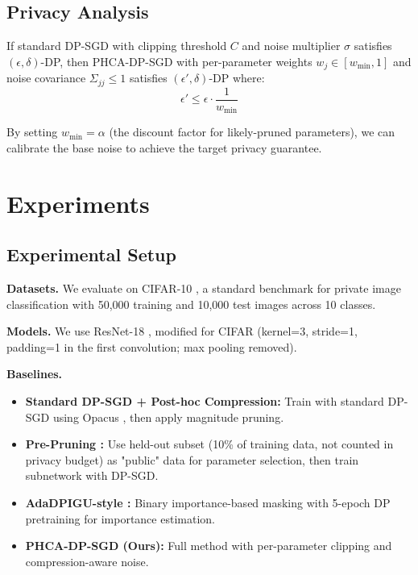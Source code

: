 \documentclass[11pt,a4paper]{article}
\begin{document}
\subsection{Privacy Analysis}

\begin{theorem}
If standard DP-SGD with clipping threshold $C$ and noise multiplier $\sigma$ satisfies $(\epsilon, \delta)$-DP, then PHCA-DP-SGD with per-parameter weights $w_j \in [w_{\min}, 1]$ and noise covariance $\Sigma_{jj} \leq 1$ satisfies $(\epsilon', \delta)$-DP where:
\begin{equation}
\epsilon' \leq \epsilon \cdot \frac{1}{w_{\min}}
\end{equation}
\end{theorem}

By setting $w_{\min} = \alpha$ (the discount factor for likely-pruned parameters), we can calibrate the base noise to achieve the target privacy guarantee.

\section{Experiments}

\subsection{Experimental Setup}

\textbf{Datasets.} We evaluate on CIFAR-10 \citep{krizhevsky2009learning}, a standard benchmark for private image classification with 50,000 training and 10,000 test images across 10 classes.

\textbf{Models.} We use ResNet-18 \citep{he2016deep}, modified for CIFAR (kernel=3, stride=1, padding=1 in the first convolution; max pooling removed).

\textbf{Baselines.}
\begin{itemize}
    \item \textbf{Standard DP-SGD + Post-hoc Compression:} Train with standard DP-SGD using Opacus \citep{yousefpour2021opacus}, then apply magnitude pruning.
    \item \textbf{Pre-Pruning \citep{adamczewski2023prepruning}:} Use held-out subset (10\% of training data, not counted in privacy budget) as "public" data for parameter selection, then train subnetwork with DP-SGD.
    \item \textbf{AdaDPIGU-style \citep{zhang2025adadpigu}:} Binary importance-based masking with 5-epoch DP pretraining for importance estimation.
    \item \textbf{PHCA-DP-SGD (Ours):} Full method with per-parameter clipping and compression-aware noise.
\end{itemize}
\end{document}
